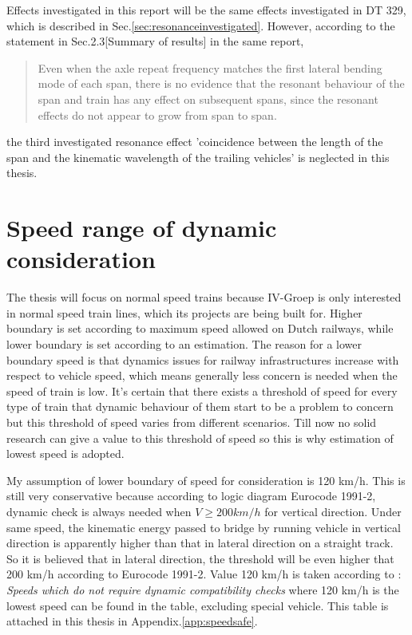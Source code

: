 Effects investigated in this report will be the same effects investigated in DT 329, which is described in Sec.\ref{sec:resonanceinvestigated}. However, according to the statement in Sec.2.3[Summary of results] in the same report,

\begin{quote}
Even when the axle repeat frequency matches the first lateral bending mode of each span, there is no evidence that the resonant behaviour of the span and train has any effect on subsequent spans, since the resonant effects do not appear to grow from span to span.
\end{quote}

the third investigated resonance effect 'coincidence between the length of the span and the kinematic wavelength of the trailing vehicles' is neglected in this thesis. 


\section{Speed range of dynamic consideration}

The thesis will focus on normal speed trains because IV-Groep is only interested in normal speed train lines, which its projects are being built for. Higher boundary is set according to maximum speed allowed on Dutch railways, while lower boundary is set according to an estimation. The reason for a lower boundary speed is that dynamics issues for railway infrastructures increase with respect to vehicle speed, which means generally less concern is needed when the speed of train is low. It's certain that there exists a threshold of speed for every type of train that dynamic behaviour of them start to be a problem to concern but this threshold of speed varies from different scenarios. Till now no solid research can give a value to this threshold of speed so this is why estimation of lowest speed is adopted. 

My assumption of lower boundary of speed for consideration is 120 km/h. This is still very conservative because according to logic diagram Eurocode 1991-2\cite{EC12}, dynamic check is always needed when $V \geq 200km/h$ for vertical direction. Under same speed, the kinematic energy passed to bridge by running vehicle in vertical direction is apparently higher than that in lateral direction on a straight track. So it is believed that in lateral direction, the threshold will be even higher that 200 km/h according to Eurocode 1991-2. Value 120 km/h is taken according to \cite[Appendix F]{EC15528}: \textit{Speeds which do not require dynamic compatibility checks} where 120 km/h is the lowest speed can be found in the table, excluding special vehicle. This table is attached in this thesis in Appendix.\ref{app:speedsafe}.

